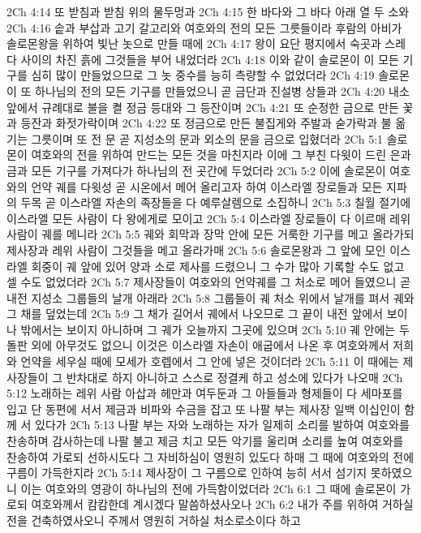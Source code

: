 2Ch 4:14  또 받침과 받침 위의 물두멍과
2Ch 4:15  한 바다와 그 바다 아래 열 두 소와
2Ch 4:16  솥과 부삽과 고기 갈고리와 여호와의 전의 모든 그릇들이라 후람의 아비가 솔로몬왕을 위하여 빛난 놋으로 만들 때에
2Ch 4:17  왕이 요단 평지에서 숙곳과 스레다 사이의 차진 흙에 그것들을 부어 내었더라
2Ch 4:18  이와 같이 솔로몬이 이 모든 기구를 심히 많이 만들었으므로 그 놋 중수를 능히 측량할 수 없었더라
2Ch 4:19  솔로몬이 또 하나님의 전의 모든 기구를 만들었으니 곧 금단과 진설병 상들과
2Ch 4:20  내소 앞에서 규례대로 불을 켤 정금 등대와 그 등잔이며
2Ch 4:21  또 순정한 금으로 만든 꽃과 등잔과 화젓가락이며
2Ch 4:22  또 정금으로 만든 불집게와 주발과 숟가락과 불 옮기는 그릇이며 또 전 문 곧 지성소의 문과 외소의 문을 금으로 입혔더라
2Ch 5:1  솔로몬이 여호와의 전을 위하여 만드는 모든 것을 마친지라 이에 그 부친 다윗이 드린 은과 금과 모든 기구를 가져다가 하나님의 전 곳간에 두었더라
2Ch 5:2  이에 솔로몬이 여호와의 언약 궤를 다윗성 곧 시온에서 메어 올리고자 하여 이스라엘 장로들과 모든 지파의 두목 곧 이스라엘 자손의 족장들을 다 예루살렘으로 소집하니
2Ch 5:3  칠월 절기에 이스라엘 모든 사람이 다 왕에게로 모이고
2Ch 5:4  이스라엘 장로들이 다 이르매 레위 사람이 궤를 메니라
2Ch 5:5  궤와 회막과 장막 안에 모든 거룩한 기구를 메고 올라가되 제사장과 레위 사람이 그것들을 메고 올라가매
2Ch 5:6  솔로몬왕과 그 앞에 모인 이스라엘 회중이 궤 앞에 있어 양과 소로 제사를 드렸으니 그 수가 많아 기록할 수도 없고 셀 수도 없었더라
2Ch 5:7  제사장들이 여호와의 언약궤를 그 처소로 메어 들였으니 곧 내전 지성소 그룹들의 날개 아래라
2Ch 5:8  그룹들이 궤 처소 위에서 날개를 펴서 궤와 그 채를 덮었는데
2Ch 5:9  그 채가 길어서 궤에서 나오므로 그 끝이 내전 앞에서 보이나 밖에서는 보이지 아니하며 그 궤가 오늘까지 그곳에 있으며
2Ch 5:10  궤 안에는 두 돌판 외에 아무것도 없으니 이것은 이스라엘 자손이 애굽에서 나온 후 여호와께서 저희와 언약을 세우실 때에 모세가 호렙에서 그 안에 넣은 것이더라
2Ch 5:11  이 때에는 제사장들이 그 반차대로 하지 아니하고 스스로 정결케 하고 성소에 있다가 나오매
2Ch 5:12  노래하는 레위 사람 아삽과 헤만과 여두둔과 그 아들들과 형제들이 다 세마포를 입고 단 동편에 서서 제금과 비파와 수금을 잡고 또 나팔 부는 제사장 일백 이십인이 함께 서 있다가
2Ch 5:13  나팔 부는 자와 노래하는 자가 일제히 소리를 발하여 여호와를 찬송하며 감사하는데 나팔 불고 제금 치고 모든 악기를 울리며 소리를 높여 여호와를 찬송하여 가로되 선하시도다 그 자비하심이 영원히 있도다 하매 그 때에 여호와의 전에 구름이 가득한지라
2Ch 5:14  제사장이 그 구름으로 인하여 능히 서서 섬기지 못하였으니 이는 여호와의 영광이 하나님의 전에 가득함이었더라
2Ch 6:1  그 때에 솔로몬이 가로되 여호와께서 캄캄한데 계시겠다 말씀하셨사오나
2Ch 6:2  내가 주를 위하여 거하실 전을 건축하였사오니 주께서 영원히 거하실 처소로소이다 하고
